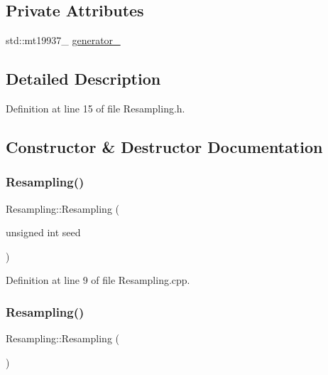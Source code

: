 \subsection*{Private Attributes}
\begin{DoxyCompactItemize}
\item 
std\+::mt19937\+\_ \mbox{\hyperlink{classbfl_1_1Resampling_abfffdeeb6fc82608a4ff2fdae3c707f0}{generator\+\_\+}}
\end{DoxyCompactItemize}


\subsection{Detailed Description}


Definition at line 15 of file Resampling.\+h.



\subsection{Constructor \& Destructor Documentation}
\mbox{\label{classbfl_1_1Resampling_a22472d13211e8384eb56e0a16cbef63c}} 
\subsubsection{\texorpdfstring{Resampling()}{Resampling()}\hspace{0.1cm}{\footnotesize\ttfamily [1/4]}}
{\footnotesize\ttfamily Resampling\+::\+Resampling (\begin{DoxyParamCaption}\item[{unsigned int}]{seed }\end{DoxyParamCaption})\hspace{0.3cm}{\ttfamily [noexcept]}}



Definition at line 9 of file Resampling.\+cpp.

\mbox{\label{classbfl_1_1Resampling_a817b9424651d6e54c5237feed607d530}} 
\subsubsection{\texorpdfstring{Resampling()}{Resampling()}\hspace{0.1cm}{\footnotesize\ttfamily [2/4]}}
{\footnotesize\ttfamily Resampling\+::\+Resampling (\begin{DoxyParamCaption}{ }\end{DoxyParamCaption})\hspace{0.3cm}{\ttfamily [noexcept]}}



